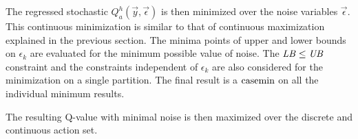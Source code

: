 The regressed stochastic $Q_a^{h}(\vec{y},\vec{\epsilon})$ is then minimized over the noise variables $\vec{\epsilon}$. This continuous minimization is similar to that of continuous maximization explained in the previous section. The minima points of upper and lower bounds on $\epsilon_k$ are evaluated for the minimum possible value of noise. The $\mathit{LB} \leq \mathit{UB}$ constraint and the constraints independent of $\epsilon_k$ are also considered for the minimization on a single partition. The final result is a $\mathrm{casemin}$ on all the individual minimum results. 

The resulting Q-value with minimal noise is then maximized over the discrete and continuous action set. 
